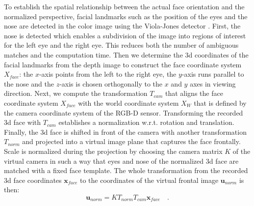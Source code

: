 To establish the spatial relationship between the actual face orientation and 
 the normalized perspective, facial landmarks such as the position of the eyes and the nose are detected in the color image using the Viola-Jones detector \cite{Viola01}.
First, the nose is detected which enables a subdivision of the image into regions of interest for the left eye and the right eye.
This reduces both the number of ambiguous matches and the computation time. Then we determine the 3d coordinates of the facial landmarks from the depth image to construct the face coordinate system $X_{face}$: the $x$-axis points from the left to the right eye, the $y$-axis runs parallel to the nose and the $z$-axis is chosen orthogonally to the $x$ and $y$ axes in viewing direction. Next, we compute the transformation $T_{cam}$ that aligns the face coordinate system $X_{face}$ with the world coordinate system $X_W$ that is defined by the camera coordinate system of the RGB-D sensor. Transforming the recorded 3d face with $T_{cam}$ establishes a normalization w.r.t. rotation and translation. Finally, the 3d face is shifted in front of the camera with another transformation $T_{norm}$ and projected into a virtual image plane that captures the face frontally. Scale is normalized during the projection by choosing the camera matrix $K$ of the virtual camera in such a way that eyes and nose of the normalized 3d face are matched with a fixed face template. The whole transformation from the recorded 3d face coordinates $\mathbf{x}_{face}$ to the coordinates of the virtual frontal image $\mathbf{u}_{norm}$ is then:
\begin{equation}
  \mathbf{u}_{norm} = K T_{norm}T_{cam}\mathbf{x}_{face} \quad .
\end{equation}



